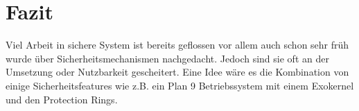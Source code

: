 \documentclass[9pt,technote]{IEEEtran}
\begin{document}
  \section{Fazit}
    Viel Arbeit in sichere System ist bereits geflossen vor allem auch schon sehr fr\"uh wurde \"uber Sicherheitsmechanismen nachgedacht.
    Jedoch sind sie oft an der Umsetzung oder Nutzbarkeit gescheitert. Eine Idee w\"are es die Kombination von einige Sicherheitsfeatures
    wie z.B. ein Plan 9 Betriebssystem mit einem Exokernel und den Protection Rings.
    
    
   \nocite{*}     


\end{document}
